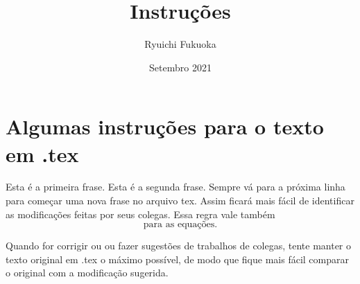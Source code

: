 \documentclass{article}
\title{Instruções}
\author{Ryuichi Fukuoka}
\date{Setembro 2021}
\begin{document}
\maketitle

\section{Algumas instruções para o texto em .tex}

\indent

Esta é a primeira frase.
Esta é a segunda frase.
Sempre vá para a próxima linha para começar uma nova frase no arquivo tex.
Assim ficará mais fácil de identificar as modificações feitas por seus colegas.
Essa regra vale também
\[
\text{para\ as\ equações}.
\]

Quando for corrigir ou ou fazer sugestões de trabalhos de colegas, tente manter o texto original em .tex o máximo possível, de modo que fique mais fácil comparar o original com a modificação sugerida.
\end{document}
